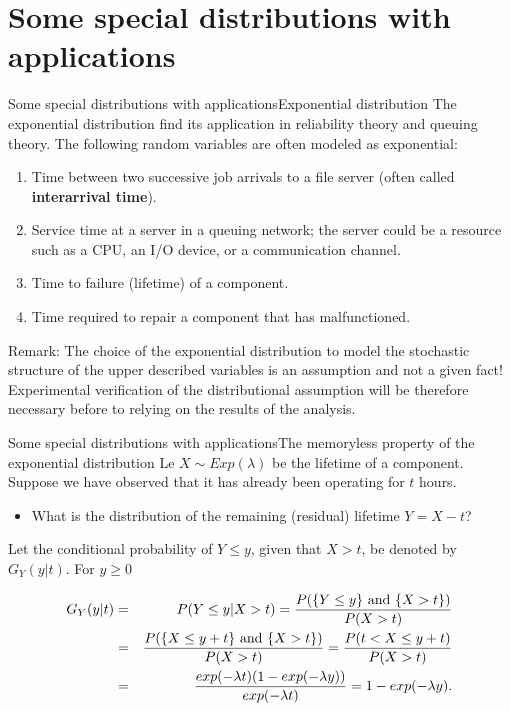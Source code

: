 \documentclass[handout]{beamer}
\begin{document}
\section{Some special distributions with applications}
\begin{frame}{Some special distributions with applications}{Exponential distribution}
The exponential distribution find its application in reliability theory and queuing theory. The 
following random variables are often modeled as exponential:
\begin{enumerate}
 \item Time between two successive job arrivals to a file server (often called \textbf{interarrival time}).
 \item Service time at a server in a queuing network; the server could be a resource such as a CPU, an I/O 
device, or a communication channel.
 \item Time to failure (lifetime) of a component.
 \item Time required to repair a component that has malfunctioned.
\end{enumerate}
Remark: The choice of the exponential distribution to model the stochastic structure of the upper 
described variables is an assumption and not a given fact! Experimental verification of the distributional
assumption will be therefore necessary before to relying on the results of the analysis.
\end{frame}

\begin{frame}{Some special distributions with applications}{The memoryless property of the exponential distribution}
Le $X\sim Exp(\lambda)$ be the lifetime of a component. Suppose we have observed that it has already been operating 
for $t$ hours.
\begin{itemize}
 \item What is the distribution of the remaining (residual) lifetime $Y=X-t$?
\end{itemize}
Let the conditional probability of $Y \leq y$, given that $X>t$, be denoted by $G_Y(y\rvert t)$. For $y\geq 0$

\begin{eqnarray*}
G_Y(y\rvert t) &=& P(Y \leq y \rvert X>t) = \frac{P(\{Y \leq y \} \textnormal{ and } \{X>t\})}{P(X>t)} \\
&=& \frac{P(\{X \leq y+t \} \textnormal{ and } \{X>t\})}{P(X>t)} = \frac{P(t < X \leq y+t)}{P(X>t)} \\
&=& \frac{exp(-\lambda t)(1-exp(-\lambda y))}{exp(-\lambda t)} = 1-exp(-\lambda y).
\end{eqnarray*}
\end{frame}
 
\end{document}
